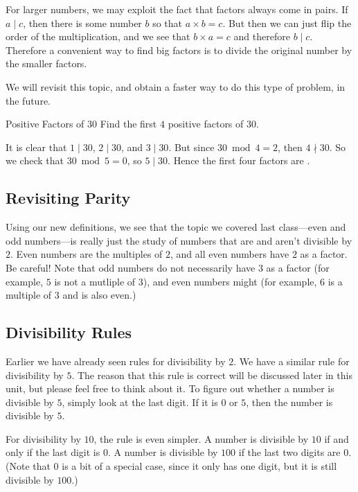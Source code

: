 \documentclass[a4paper,10pt]{report}
\begin{document}
For larger numbers, we may exploit the fact that factors always come in pairs.
If \(a \mid c\), then there is some number \(b\) so that \(a \times b = c\).
But then we can just flip the order of the multiplication, and we see that \(b
\times a = c\) and therefore \(b \mid c\). Therefore a convenient way to find
big factors is to divide the original number by the smaller factors.

We will revisit this topic, and obtain a faster way to do this type of problem,
in the future.

\begin{problem}{Positive Factors of \(30\)}
 Find the first \(4\) positive factors of \(30\).

 \begin{solution}
  It is clear that \(1 \mid 30\), \(2 \mid 30\), and \(3 \mid 30\). But since
  \(30 \bmod 4 = 2\), then \(4 \nmid 30\). So we check that \(30 \bmod 5 = 0\),
  so \(5 \mid 30\). Hence the first four factors are .
 \end{solution}
\end{problem}

\subsection{Revisiting Parity}

Using our new definitions, we see that the topic we covered last class---even
and odd numbers---is really just the study of numbers that are and aren't
divisible by \(2\). Even numbers are the multiples of \(2\), and all even
numbers have \(2\) as a factor. Be careful! Note that odd numbers do not
necessarily have \(3\) as a factor (for example, \(5\) is not a mutliple of
\(3\)), and even numbers might (for example, \(6\) is a multiple of \(3\) and
is also even.)

\subsection{Divisibility Rules}

Earlier we have already seen rules for divisibility by \(2\). We have a similar
rule for divisibility by \(5\). The reason that this rule is correct will be
discussed later in this unit, but please feel free to think about it. To figure
out whether a number is divisible by \(5\), simply look at the last digit. If
it is \(0\) or \(5\), then the number is divisible by \(5\).

For divisibility by \(10\), the rule is even simpler. A number is divisible by
\(10\) if and only if the last digit is \(0\). A number is divisible by \(100\)
if the last two digits are \(0\). (Note that \(0\) is a bit of a special case,
since it only has one digit, but it is still divisible by \(100\).)
\end{document}
